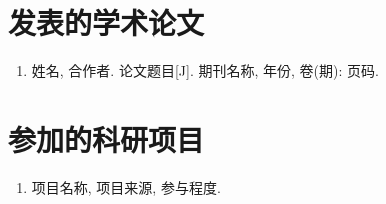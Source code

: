 \begin{resume}
  \section*{发表的学术论文}
  \begin{enumerate}
  \item 姓名, 合作者. 论文题目[J]. 期刊名称, 年份, 卷(期): 页码.
  \end{enumerate}

  \section*{参加的科研项目}
  \begin{enumerate}
  \item 项目名称, 项目来源, 参与程度.
  \end{enumerate}
\end{resume}
